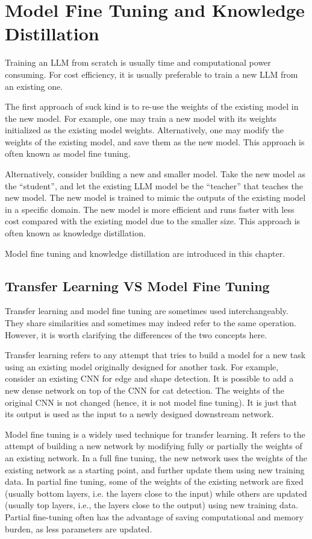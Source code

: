 \chapter{Model Fine Tuning and Knowledge Distillation} \label{ch:ft}

Training an LLM from scratch is usually time and computational power consuming. For cost efficiency, it is usually preferable to train a new LLM from an existing one. 

The first approach of suck kind is to re-use the weights of the existing model in the new model. For example, one may train a new model with its weights initialized as the existing model weights. Alternatively, one may modify the weights of the existing model, and save them as the new model. This approach is often known as model fine tuning.

Alternatively, consider building a new and smaller model. Take the new model as the ``student'', and let the existing LLM model be the ``teacher'' that teaches the new model. The new model is trained to mimic the outputs of the existing model in a specific domain. The new model is more efficient and runs faster with less cost compared with the existing model due to the smaller size. This approach is often known as knowledge distillation.

Model fine tuning and knowledge distillation are introduced in this chapter.

\section{Transfer Learning VS Model Fine Tuning}

Transfer learning and model fine tuning are sometimes used interchangeably. They share similarities and sometimes may indeed refer to the same operation. However, it is worth clarifying the differences of the two concepts here.

Transfer learning refers to any attempt that tries to build a model for a new task using an existing model originally designed for another task. For example, consider an existing CNN for edge and shape detection. It is possible to add a new dense network on top of the CNN for cat detection. The weights of the original CNN is not changed (hence, it is not model fine tuning). It is just that its output is used as the input to a newly designed downstream network.

Model fine tuning is a widely used technique for transfer learning. It refers to the attempt of building a new network by modifying fully or partially the weights of an existing network. In a full fine tuning, the new network uses the weights of the existing network as a starting point, and further update them using new training data. In partial fine tuning, some of the weights of the existing network are fixed (usually bottom layers, i.e. the layers close to the input) while others are updated (usually top layers, i.e., the layers close to the output) using new training data. Partial fine-tuning often has the advantage of saving computational and memory burden, as less parameters are updated.

